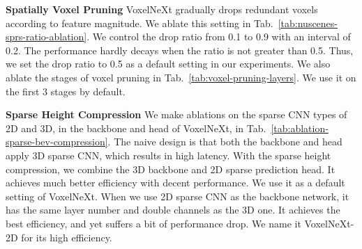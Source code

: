 \documentclass[10pt,twocolumn,letterpaper]{article}
\begin{document}
\begin{table*}[t]
\begin{center}
\caption{Performance of 3D object detection results Argoverse2 dataset.}
\vspace{-5pt}
\label{tab:argo2-allclasses}
\end{center}
\end{table*}
\vspace{0.5em}
\noindent
\textbf{Spatially Voxel Pruning}
VoxelNeXt gradually drops redundant voxels according to feature magnitude. We ablate this setting in Tab.~\ref{tab:nuscenes-sprs-ratio-ablation}. We control the drop ratio from 0.1 to 0.9 with an interval of 0.2.
The performance hardly decays when the ratio is not greater than 0.5. Thus, we set the drop ratio to 0.5 as a default setting in our experiments. We also ablate the stages of voxel pruning in Tab.~\ref{tab:voxel-pruning-layers}. We use it on the first 3 stages by default.

\vspace{0.5em}
\noindent
\textbf{Sparse Height Compression}
We make ablations on the sparse CNN types of 2D and 3D, in the backbone and head of VoxelNeXt, in Tab.~\ref{tab:ablation-sparse-bev-compression}. The naive design is that both the backbone and head apply 3D sparse CNN, which results in high latency. With the sparse height compression, we combine the 3D backbone and 2D sparse prediction head. It achieves much better efficiency with decent performance. We use it as a default setting of VoxelNeXt. When we use 2D sparse CNN as the backbone network, it has the same layer number and double channels as the 3D one. It achieves the best efficiency, and yet suffers a bit of performance drop. We name it VoxelNeXt-2D for its high efficiency.
\end{document}
